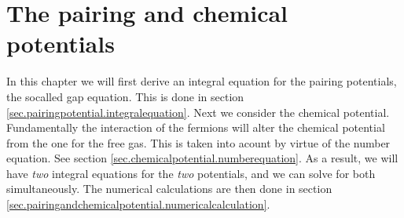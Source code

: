 
\chapter{The pairing and chemical potentials} %

\label{Chapter5} %


In this chapter we will first derive an integral equation for the pairing potentials, the socalled gap equation. This is done in section \ref{sec.pairingpotential.integralequation}. Next we consider the chemical potential. Fundamentally the interaction of the fermions will alter the chemical potential from the one for the free gas. This is taken into acount by virtue of the number equation. See section \ref{sec.chemicalpotential.numberequation}. As a result, we will have \textit{two} integral equations for the \textit{two} potentials, and we can solve for both simultaneously. The numerical calculations are then done in section \ref{sec.pairingandchemicalpotential.numericalcalculation}. 

